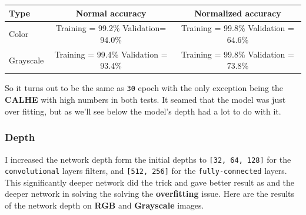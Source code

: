 \documentclass[11pt]{article}
\begin{document}
\begin{longtable}[]{@{}lcc@{}}
\toprule
\begin{minipage}[b]{0.24\columnwidth}\raggedright
Type\strut
\end{minipage} & \begin{minipage}[b]{0.34\columnwidth}\centering
Normal accuracy\strut
\end{minipage} & \begin{minipage}[b]{0.34\columnwidth}\centering
Normalized accuracy\strut
\end{minipage}\tabularnewline
\midrule
\endhead
\begin{minipage}[t]{0.24\columnwidth}\raggedright
Color\strut
\end{minipage} & \begin{minipage}[t]{0.34\columnwidth}\centering
Training = 99.2\% Validation= 94.0\%\strut
\end{minipage} & \begin{minipage}[t]{0.34\columnwidth}\centering
Training = 99.8\% Validation = 64.6\%\strut
\end{minipage}\tabularnewline
\begin{minipage}[t]{0.24\columnwidth}\raggedright
Grayscale\strut
\end{minipage} & \begin{minipage}[t]{0.34\columnwidth}\centering
Training = 99.4\% Validation = 93.4\%\strut
\end{minipage} & \begin{minipage}[t]{0.34\columnwidth}\centering
Training = 99.8\% Validation = 73.8\%\strut
\end{minipage}\tabularnewline
\bottomrule
\end{longtable}

So it turns out to be the same as \texttt{30} epoch with the only
exception being the \textbf{CALHE} with high numbers in both tests. It
seamed that the model was just over fitting, but as we'll see below the
model's depth had a lot to do with it.

\hypertarget{depth}{%
\subsubsection{Depth}\label{depth}}

I increased the network depth form the initial depths to
\texttt{{[}32,\ 64,\ 128{]}} for the \texttt{convolutional} layers
filters, and \texttt{{[}512,\ 256{]}} for the \texttt{fully-connected}
layers. This significantly deeper network did the trick and gave better
result as and the deeper network in solving the solving the
\textbf{overfitting} issue. Here are the results of the network depth on
\textbf{RGB} and \textbf{Grayscale} images.
\end{document}
